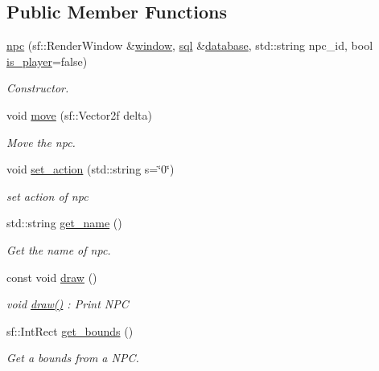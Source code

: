 \subsection*{Public Member Functions}
\begin{DoxyCompactItemize}
\item 
\hyperlink{classnpc_ac99eae829579a6f49387bd44129ec33a}{npc} (sf\+::\+Render\+Window \&\hyperlink{classnpc_a7fde3d3012e4dff0d02bf882fa466fc6}{window}, \hyperlink{classsql}{sql} \&\hyperlink{classnpc_a092e6acb7f951c0805d6c4c948ccd37d}{database}, std\+::string npc\+\_\+id, bool \hyperlink{classnpc_a3815e143f7d384cb9bd0a1ab45c729a5}{is\+\_\+player}=false)
\begin{DoxyCompactList}\small\item\em Constructor. \end{DoxyCompactList}\item 
void \hyperlink{classnpc_ae8d1bfcd87382237192ebb5b6def33a5}{move} (sf\+::\+Vector2f delta)
\begin{DoxyCompactList}\small\item\em Move the npc. \end{DoxyCompactList}\item 
void \hyperlink{classnpc_aa86a880284a09f9fc3358a61a74be1b9}{set\+\_\+action} (std\+::string s=\char`\"{}0\char`\"{})
\begin{DoxyCompactList}\small\item\em set action of npc \end{DoxyCompactList}\item 
std\+::string \hyperlink{classnpc_a670b40abcf52e0615883622324ac3bc9}{get\+\_\+name} ()
\begin{DoxyCompactList}\small\item\em Get the name of npc. \end{DoxyCompactList}\item 
const void \hyperlink{classnpc_a1adf71c32d8948c9718568d1a2a6d9a7}{draw} ()
\begin{DoxyCompactList}\small\item\em void \hyperlink{classnpc_a1adf71c32d8948c9718568d1a2a6d9a7}{draw()} \+: Print N\+PC \end{DoxyCompactList}\item 
sf\+::\+Int\+Rect \hyperlink{classnpc_aa6a71f7355403e4a108f3c4e8b6a3931}{get\+\_\+bounds} ()
\begin{DoxyCompactList}\small\item\em Get a bounds from a N\+PC. \end{DoxyCompactList}\item 

\end{DoxyCompactItemize}
